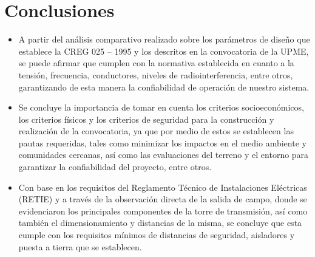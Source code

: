 \section*{Conclusiones}
\begin{itemize}
    \item A partir del análisis comparativo realizado sobre los parámetros de diseño que establece la CREG 025 – 1995 y los descritos en la convocatoria de la UPME, se puede afirmar que cumplen con la normativa establecida en cuanto a la tensión, frecuencia, conductores, niveles de radiointerferencia, entre otros, garantizando de esta manera la confiabilidad de operación de nuestro sistema.\\
    \item Se concluye la importancia de tomar en cuenta los criterios socioeconómicos, los criterios físicos y los criterios de seguridad para la construcción y realización de la convocatoria, ya que por medio de estos se establecen las pautas requeridas, tales como minimizar los impactos en el medio ambiente y comunidades cercanas, así como las evaluaciones del terreno y el entorno para garantizar la confiabilidad del proyecto, entre otros.\\
    \item Con base en los requisitos del Reglamento Técnico de Instalaciones Eléctricas (RETIE) y a través de la observación directa de la salida de campo, donde se evidenciaron los principales componentes de la torre de transmisión, así como también el dimensionamiento y distancias de la misma, se concluye que esta cumple con los requisitos mínimos de distancias de seguridad, aisladores y puesta a tierra que se establecen.
\end{itemize}


